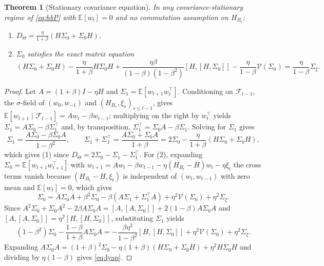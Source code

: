 \documentclass[11pt]{article}
\newtheorem{theorem}{Theorem}
\theoremstyle{remark}
\newcommand{\E}{\mathbb{E}}
\begin{document}
\begin{theorem}[Stationary covariance equation]\label{thm:lyap}
In any covariance-stationary regime of \eqref{eq:hbP} with $\E[w_t] = 0$ and no commutation assumption on $H_{B_t}$:
\begin{enumerate}
\item[(1)] $D_\Theta = \frac{\eta}{1+\beta}(H\Sigma_0 + \Sigma_0 H)$.
\item[(2)] $\Sigma_0$ satisfies the exact matrix equation
\begin{equation}\label{eq:lyap}
(H\Sigma_0 + \Sigma_0 H) - \frac{\eta}{1+\beta}H\Sigma_0 H + \frac{\eta\beta}{(1-\beta)(1-\beta^2)}[H,[H,\Sigma_0]] - \frac{\eta}{1-\beta}\mathcal V(\Sigma_0) = \frac{\eta}{1-\beta}\Sigma_\xi.
\end{equation}
\end{enumerate}
\end{theorem}
\begin{proof}
Let $A = (1+\beta)I - \eta H$ and $\Sigma_1 = \E[w_{t+1}w_t^\top]$. Conditioning on $\mathcal F_{t-1}$, the $\sigma$-field of $(w_0,w_{-1})$ and $(H_{B_s},\xi_s)_{s\le t-1}$, gives $\E[w_{t+1}\mid \mathcal F_{t-1}] = A w_t - \beta w_{t-1}$; multiplying on the right by $w_t^\top$ yields $\Sigma_1 = A\Sigma_0 - \beta\Sigma_1^\top$ and, by transposition, $\Sigma_1^\top = \Sigma_0 A - \beta\Sigma_1$. Solving for $\Sigma_1$ gives
\[
\Sigma_1 = \frac{A\Sigma_0 - \beta\Sigma_0 A}{1-\beta^2}, \qquad \Sigma_1 + \Sigma_1^\top = \frac{A\Sigma_0 + \Sigma_0 A}{1+\beta} = 2\Sigma_0 - \frac{\eta}{1+\beta}(H\Sigma_0 + \Sigma_0 H),
\]
which gives (1) since $D_\Theta = 2\Sigma_0 - \Sigma_1 - \Sigma_1^\top$. For (2), expanding $\Sigma_0 = \E[w_{t+1}w_{t+1}^\top]$ with $w_{t+1} = Aw_t - \beta w_{t-1} - \eta(H_{B_t}-H)w_t - \eta\xi_t$ the cross terms vanish because $(H_{B_t}-H,\xi_t)$ is independent of $(w_t,w_{t-1})$ with zero mean and $\E[w_t]=0$, which gives
\[
\Sigma_0 = A\Sigma_0 A + \beta^2 \Sigma_0 - \beta(A\Sigma_1 + \Sigma_1^\top A) + \eta^2 \mathcal V(\Sigma_0) + \eta^2 \Sigma_\xi.
\]
Since $A^2\Sigma_0 + \Sigma_0 A^2 - 2\beta A\Sigma_0 A = [A,[A,\Sigma_0]] + 2(1-\beta)A\Sigma_0 A$ and $[A,[A,\Sigma_0]] = \eta^2[H,[H,\Sigma_0]]$, substituting $\Sigma_1$ yields
\[
(1-\beta^2)\Sigma_0 - \frac{1-\beta}{1+\beta}A\Sigma_0 A = -\frac{\beta\eta^2}{1-\beta^2}[H,[H,\Sigma_0]] + \eta^2\mathcal V(\Sigma_0) + \eta^2\Sigma_\xi.
\]
Expanding $A\Sigma_0 A = (1+\beta)^2\Sigma_0 - \eta(1+\beta)(H\Sigma_0+\Sigma_0 H) + \eta^2 H\Sigma_0 H$ and dividing by $\eta(1-\beta)$ gives \eqref{eq:lyap}.
\end{proof}
\end{document}
